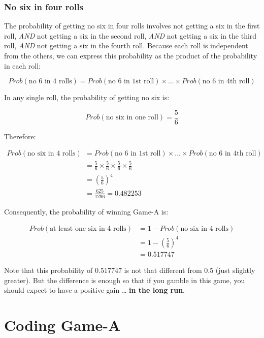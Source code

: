 \documentclass[
]{book}
\begin{document}
\hypertarget{no-six-in-four-rolls}{%
\subsection{No six in four rolls}\label{no-six-in-four-rolls}}

The probability of getting no six in four rolls involves not getting a six
in the first roll, \emph{AND} not getting a six in the second roll, \emph{AND} not
getting a six in the third roll, \emph{AND} not getting a six in the fourth roll.
Because each roll is independent from the others, we can express this
probability as the product of the probability in each roll:

\[
Prob(\text{no 6 in 4 rolls}) = Prob(\text{no 6 in 1st roll}) \times \dots \times Prob(\text{no 6 in 4th roll})
\]

In any single roll, the probability of getting no six is:

\[
Prob(\text{no six in one roll}) = \frac{5}{6}
\]

Therefore:

\begin{align*}
Prob(\text{no six in 4 rolls}) &= Prob(\text{no 6 in 1st roll}) \times \dots \times Prob(\text{no 6 in 4th roll}) \\
&= \frac{5}{6} \times \frac{5}{6} \times \frac{5}{6} \times \frac{5}{6} \\
&= \left( \frac{5}{6} \right)^4 \\
&= \frac{625}{1296} = 0.482253
\end{align*}

Consequently, the probability of winning Game-A is:

\begin{align*}
Prob(\text{at least one six in 4 rolls}) &= 1 - Prob(\text{no six in 4 rolls}) \\
&= 1 - \left( \frac{5}{6} \right)^4 \\
&= 0.517747
\end{align*}

Note that this probability of 0.517747 is not that different from 0.5 (just
slightly greater). But the difference is enough so that if you gamble in this
game, you should expect to have a positive gain \ldots{} \textbf{in the long run}.

\hypertarget{coding-game-a}{%
\chapter{Coding Game-A}\label{coding-game-a}}
\end{document}
